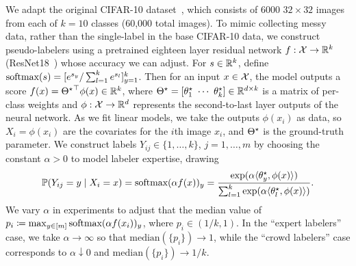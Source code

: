 \newcommand{\softmax}{\textup{softmax}}

We adapt the original
CIFAR-10 dataset~\cite{KrizhevskyHi09}, which consists of 6000 $32 \times
32$ images from each of $k = 10$ classes (60,000 total images).
%
To mimic collecting messy data, rather than the single-label
in the base CIFAR-10 data, we construct pseudo-labelers
using a pretrained eighteen layer residual network
$f: \mathcal{X} \to \mathbb{R}^k$ (ResNet18~\cite{HeZhReSu16}) whose accuracy we can
adjust.
%
For $s \in \mathbb{R}^k$, define $\softmax(s) = [e^{s_y} /
  \sum_{l = 1}^k e^{s_l}]_{y = 1}^k$.
%
Then for an input $x \in \mathcal{X}$, the model outputs a score $f(x)
= {\Theta^\star}^\top \phi(x) \in \mathbb{R}^k$, where
$\Theta^\star = [\theta_1^\star ~ \cdots ~ \theta_k^\star] \in \mathbb{R}^{d \times k}$
is a matrix of per-class weights and
$\phi : \mathcal{X} \to \mathbb{R}^d$ represents the second-to-last layer
outputs of the neural network.
%
%
As we fit linear models, we take the outputs $\phi(x_i)$ as data, so
$X_i = \phi(x_i)$ are the covariates for the $i$th image $x_i$,
and $\Theta^\star$
is the ground-truth parameter.  We construct labels $Y_{ij}
\in \{1, \ldots, k\}$, $j = 1, \ldots, m$
by choosing the constant $\alpha > 0$
to model labeler expertise, drawing
\begin{equation*}
  \P(Y_{ij} = y \mid X_i = x)
  = \softmax(\alpha f(x))_y
  = \frac{\exp(\alpha \<\theta\opt_y, \phi(x)\>)}{
    \sum_{l = 1}^k \exp(\alpha \<\theta\opt_l, \phi(x)\>)}.
\end{equation*}
We vary $\alpha$ in experiments to adjust that the median value
of $p_i \defeq \max_{y \in [m]} \softmax(\alpha f(x_i))_y$, where
$p_i \in (1/k, 1)$. In the ``expert labelers'' case, we take
$\alpha \to \infty$ so that $\mbox{median}(\{p_i\}) \to 1$,
while the ``crowd labelers'' case corresponds to
$\alpha \downarrow 0$ and $\mbox{median}(\{p_i\}) \to 1/k$.

